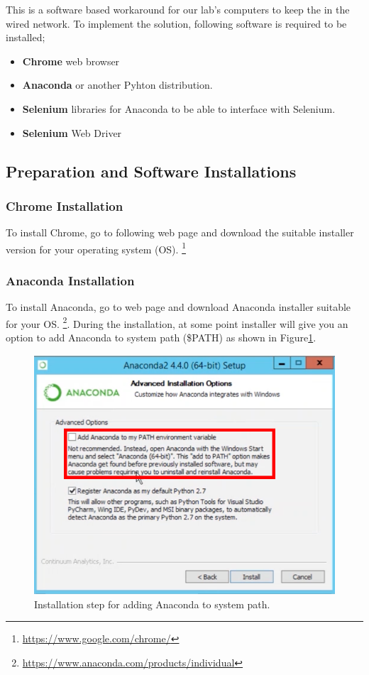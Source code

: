 This is a software based workaround for our lab's computers to keep the in the
wired network. To implement the solution, following software is required to be
installed;

\begin{itemize}
 \item \textbf{Chrome} web browser
 \item \textbf{Anaconda} or another Pyhton distribution. 
 \item \textbf{Selenium} libraries for Anaconda to be able to interface with Selenium.
 \item \textbf{Selenium} Web Driver
\end{itemize}

\subsection{Preparation and Software Installations}
\subsubsection{Chrome Installation}
To install Chrome, go to following web page and download the suitable installer version
for your operating system (OS). \footnote{\url{https://www.google.com/chrome/}}

\subsubsection{Anaconda Installation}
To install Anaconda, go to web page and download Anaconda installer suitable for your  
OS. \footnote{\url{https://www.anaconda.com/products/individual}}. During the installation, at some
point installer will give you an option to add Anaconda to system path (\$PATH) as
shown in Figure\ref{fig:AnacondaInstall}.

\begin{figure}[H]
    \centering
	\includegraphics[angle=0,origin=c,width = .8\linewidth]{Section_Ethernet/Figures/Anaconda_PATH.png}
    \caption{Installation step for adding Anaconda to system path.}
    \label{fig:AnacondaInstall}
\end{figure}

